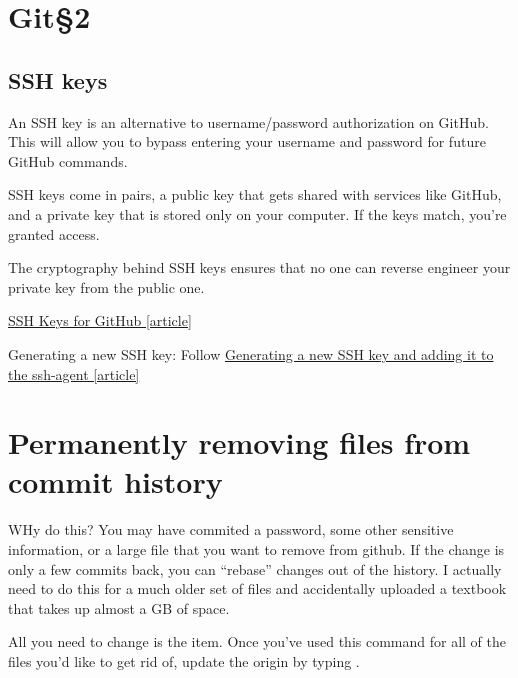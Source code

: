 \section{Git\S 2}

\subsection{SSH keys}

An SSH key is an alternative to username/password authorization on GitHub. This will allow you to bypass entering your username and password for future GitHub commands.


SSH keys come in pairs, a public key that gets shared with services like GitHub, and a private key that is stored only on your computer. If the keys match, you're granted access.

The cryptography behind SSH keys ensures that no one can reverse engineer your private key from the public one.

\href{https://jdblischak.github.io/2014-09-18-chicago/novice/git/05-sshkeys.html}{SSH Keys for GitHub [article]}

Generating a new SSH key: Follow \href{https://docs.github.com/en/free-pro-team@latest/github/authenticating-to-github/generating-a-new-ssh-key-and-adding-it-to-the-ssh-agent}{Generating a new SSH key and adding it to the ssh-agent [article]}


\section{Permanently removing files from commit history}

WHy do this? You may have commited a password, some other sensitive information, or a large file that you want to remove from github. If the change is only a few commits back, you can 	``rebase'' changes out of the history. I actually need to do this for a much older set of files and accidentally uploaded a textbook that takes up almost a GB of space. 


All you need to change is the  item. Once you've used this command for all of the files you'd like to get rid of, update the origin by typing . 


